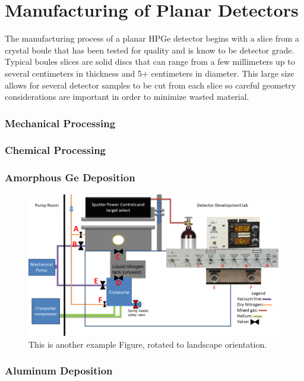 \chapter{Manufacturing of Planar Detectors}
The manufacturing process of a planar HPGe detector begins with a slice from a crystal boule that has been tested for quality and is know to be detector grade. Typical boules slices are solid discs that can range from a few millimeters up to several centimeters in thickness and 5+ centimeters in diameter. This large size allows for several detector samples to be cut from each slice so careful geometry considerations are important in order to minimize wasted material.


\subsection{Mechanical Processing}

\subsection{Chemical Processing}

\subsection{Amorphous Ge Deposition}

\begin{figure}
\includegraphics[width=\textwidth]{figures/sput-flow}
\caption{This is another example Figure, rotated to landscape orientation.}
\label{LandscapeFigure}
\end{figure}

\subsection{Aluminum Deposition}


